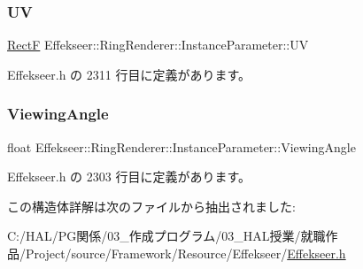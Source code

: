 \subsubsection{\texorpdfstring{UV}{UV}}
{\footnotesize\ttfamily \mbox{\hyperlink{struct_effekseer_1_1_rect_f}{RectF}} Effekseer\+::\+Ring\+Renderer\+::\+Instance\+Parameter\+::\+UV}



 Effekseer.\+h の 2311 行目に定義があります。

\mbox{\label{struct_effekseer_1_1_ring_renderer_1_1_instance_parameter_a6190409d348a699ca3959fb9416ad0a3}} 
\subsubsection{\texorpdfstring{Viewing\+Angle}{ViewingAngle}}
{\footnotesize\ttfamily float Effekseer\+::\+Ring\+Renderer\+::\+Instance\+Parameter\+::\+Viewing\+Angle}



 Effekseer.\+h の 2303 行目に定義があります。



この構造体詳解は次のファイルから抽出されました\+:\begin{DoxyCompactItemize}
\item 
C\+:/\+H\+A\+L/\+P\+G関係/03\+\_\+作成プログラム/03\+\_\+\+H\+A\+L授業/就職作品/\+Project/source/\+Framework/\+Resource/\+Effekseer/\mbox{\hyperlink{_effekseer_8h}{Effekseer.\+h}}\end{DoxyCompactItemize}
